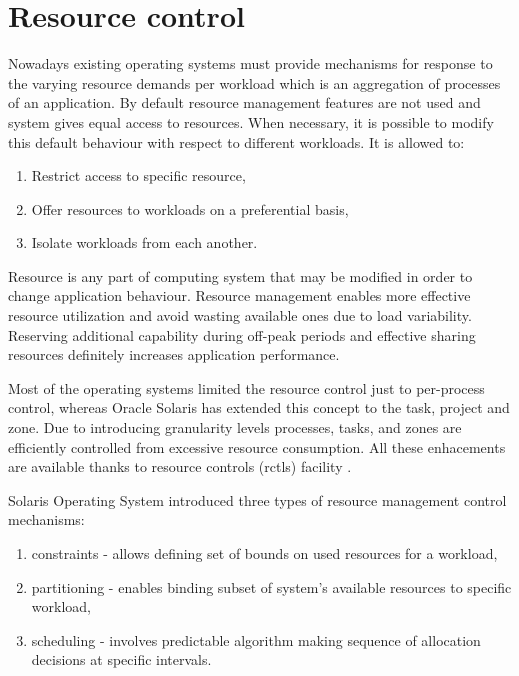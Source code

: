 \documentclass[11pt]{book}
\begin{document}
    \section{Resource control}
    \label{sec:sol:res}

      Nowadays existing operating systems must provide mechanisms for response to the varying resource demands per
      workload which is an aggregation of processes of an application. By default resource management features are not
      used and system gives equal access to resources. When necessary, it is possible to modify this default behaviour
      with respect to different workloads. It is allowed to:

      \begin{enumerate}
        \item Restrict access to specific resource,
        \item Offer resources to workloads on a preferential basis,
        \item Isolate workloads from each another.
      \end{enumerate}
	
      Resource is any part of computing system that may be modified in order to change application behaviour. Resource
      management enables more effective resource utilization and avoid wasting available ones due to load variability.
      Reserving additional capability during off-peak periods and effective sharing resources definitely increases
      application performance.

      Most of the operating systems limited the resource control just to per-process control, whereas Oracle Solaris has
      extended this concept to the task, project and zone. Due to introducing granularity levels processes, tasks, and 
      zones are efficiently controlled from excessive resource consumption. All these enhacements are available thanks 
      to resource controls (rctls) facility \cite{oracle_admin_guide}.
      
      Solaris Operating System introduced three types of resource management control mechanisms:

      \begin{enumerate}
        \item constraints - allows defining set of bounds on used resources for a workload,
        \item partitioning - enables binding subset of system's available resources to specific workload,
        \item scheduling - involves predictable algorithm making sequence of allocation decisions at specific intervals.
      \end{enumerate}
\end{document}
